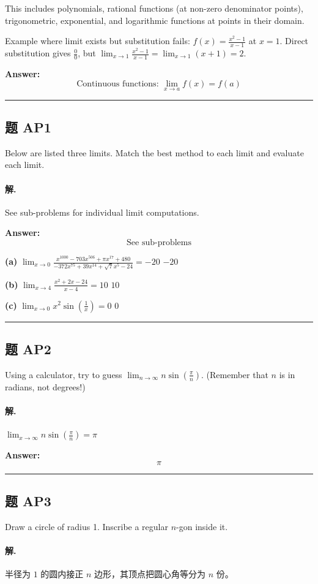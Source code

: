 \documentclass[12pt, a4paper]{article}
\newcommand{\problem}[1]{\subsection*{题 #1}}
\newcommand{\solution}{\paragraph{解.}}
\begin{document}
This includes polynomials, rational functions (at non-zero denominator points), trigonometric, exponential, and logarithmic functions at points in their domain.

Example where limit exists but substitution fails: $f(x) = \frac{x^2 - 1}{x - 1}$ at $x = 1$. Direct substitution gives $\frac{0}{0}$, but $\lim_{x \to 1} \frac{x^2-1}{x-1} = \lim_{x \to 1}(x+1) = 2$.

\textbf{Answer:}
\[\boxed{\text{Continuous functions: } \lim_{x \to a} f(x) = f(a)}\]

\vspace{1em}
\hrule
\vspace{1em}

\problem{AP1}

Below are listed three limits. Match the best method to each limit and evaluate each limit.

\solution

See sub-problems for individual limit computations.

\textbf{Answer:}
\[\boxed{\text{See sub-problems}}\]

\textbf{(a)}
$\lim_{x \to 0} \frac{x^{1000} - 703 x^{506} + \pi x^{17} + 480}{- 372 x^{75} + 39 x^{14} + \sqrt{7} x^{5} - 24} = -20$
$\boxed{-20}$

\textbf{(b)}
$\lim_{x \to 4} \frac{x^{2} + 2 x - 24}{x - 4} = 10$
$\boxed{10}$

\textbf{(c)}
$\lim_{x \to 0} x^{2} \sin{\left(\frac{1}{x} \right)} = 0$
$\boxed{0}$

\vspace{1em}
\hrule
\vspace{1em}

\problem{AP2}

Using a calculator, try to guess $\lim_{n \to \infty} n \sin(\frac{\pi}{n})$. (Remember that $n$ is in radians, not degrees!)

\solution

$\lim_{x \to \infty} n \sin{\left(\frac{\pi}{n} \right)} = \pi$

\textbf{Answer:}
\[\boxed{\pi}\]

\vspace{1em}
\hrule
\vspace{1em}

\problem{AP3}

Draw a circle of radius 1. Inscribe a regular $n$-gon inside it.

\solution

半径为 $1$ 的圆内接正 $n$ 边形，其顶点把圆心角等分为 $n$ 份。
\end{document}
